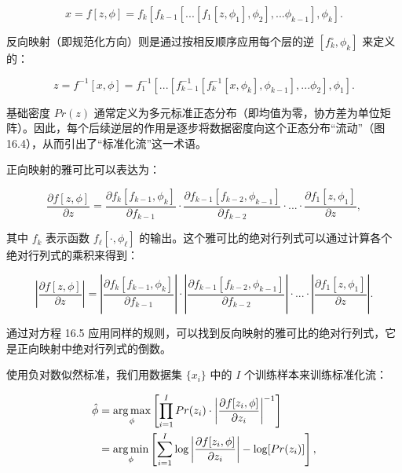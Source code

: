 \documentclass[lang=cn,newtx,10pt,scheme=chinese]{elegantbook}
\begin{document}
\begin{equation}
x = f[z, \phi] = f_k \left[ f_{k-1} \left[ ... \left[ f_1[z, \phi_1], \phi_2 \right], ... \phi_{k-1} \right], \phi_k \right]. 
\end{equation}

反向映射（即规范化方向）则是通过按相反顺序应用每个层的逆 \([f_k^{\circ}, \phi_k]\) 来定义的：

\begin{equation}
z = f^{-1}[x, \phi] = f_1^{-1} \left[ ... \left[ f_{k-1}^{-1} \left[ f_k^{-1}[x, \phi_k], \phi_{k-1} \right], ... \phi_2 \right], \phi_1 \right]. 
\end{equation}

基础密度 \(Pr(z)\) 通常定义为多元标准正态分布（即均值为零，协方差为单位矩阵）。因此，每个后续逆层的作用是逐步将数据密度向这个正态分布“流动”（图 16.4），从而引出了“标准化流”这一术语。

正向映射的雅可比可以表达为：

\begin{equation}
\frac{\partial f[z, \phi]}{\partial z} = \frac{\partial f_k[f_{k-1}, \phi_k]}{\partial f_{k-1}} \cdot \frac{\partial f_{k-1}[f_{k-2}, \phi_{k-1}]}{\partial f_{k-2}} \cdot ... \cdot \frac{\partial f_1[z, \phi_1]}{\partial z}, 
\end{equation}

其中 \(f_k\) 表示函数 \(f_{\ell}[\cdot, \phi_{\ell}]\) 的输出。这个雅可比的绝对行列式可以通过计算各个绝对行列式的乘积来得到：

\begin{equation}
\left| \frac{\partial f[z, \phi]}{\partial z} \right| = \left| \frac{\partial f_k[f_{k-1}, \phi_k]}{\partial f_{k-1}} \right| \cdot \left| \frac{\partial f_{k-1}[f_{k-2}, \phi_{k-1}]}{\partial f_{k-2}} \right| \cdot ... \cdot \left| \frac{\partial f_1[z, \phi_1]}{\partial z} \right|. 
\end{equation}

通过对方程 16.5 应用同样的规则，可以找到反向映射的雅可比的绝对行列式，它是正向映射中绝对行列式的倒数。

使用负对数似然标准，我们用数据集 \(\{x_i\}\) 中的 \(I\) 个训练样本来训练标准化流：


\begin{align}
\hat{\phi} &= \underset{\phi}{\arg\max} \left[ \prod_{i=1}^I Pr(z_i) \cdot \left| \frac{\partial f[z_i, \phi]}{\partial z_i} \right|^{-1} \right] \notag \\
&= \underset{\phi}{\arg\min} \left[ \sum_{i=1}^I \log \left| \frac{\partial f[z_i, \phi]}{\partial z_i} \right| - \log[Pr(z_i)] \right], 
\end{align} 
\end{document}
